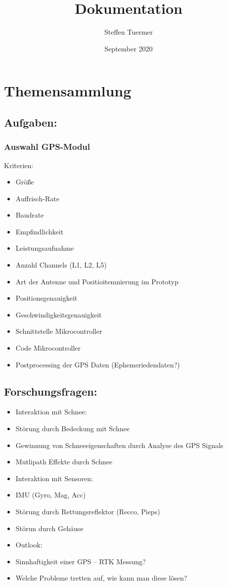 \documentclass{article}
\title{Dokumentation}
\author{Steffen Tuermer }
\date{September 2020}
\begin{document}
\maketitle

\section{Themensammlung}
\subsection{Aufgaben:}

\subsubsection{Auswahl GPS-Modul}
Kriterien:
\begin{itemize}
\item	
Größe
\item	
Auffrisch-Rate
\item	
Baudrate
\item	
Empfindlichkeit
\item	
Leistungsaufnahme
\item	
Anzahl Channels (L1, L2, L5)
\item	
Art der Antenne und Positioitemnierung im Prototyp
\item	
Positionsgenauigkeit
\item	
Geschwindigkeitsgenauigkeit
\item	Schnittstelle Mikrocontroller
\item	Code Mikrocontroller
\item	Postprocessing der GPS Daten (Ephemeriedendaten?)
\end{itemize}

\subsection{Forschungsfragen:}

\begin{itemize}


\item	Interaktion mit Schnee:
\item	Störung durch Bedeckung mit Schnee
\item	Gewinnung von Schneeeigenschaften durch Analyse des GPS Signals
\item	Mutlipath Effekte durch Schnee
\item	Interaktion mit Sensoren:
\item	IMU (Gyro, Mag, Acc)
\item	Störung durch Rettungsreflektor (Recco, Pieps)
\item	Störun durch Gehäuse
\item	Outlook:
\item	Sinnhaftigkeit einer GPS – RTK Messung?
\item	Welche Probleme tretten auf, wie kann man diese lösen?

\end{itemize}
\end{document}
